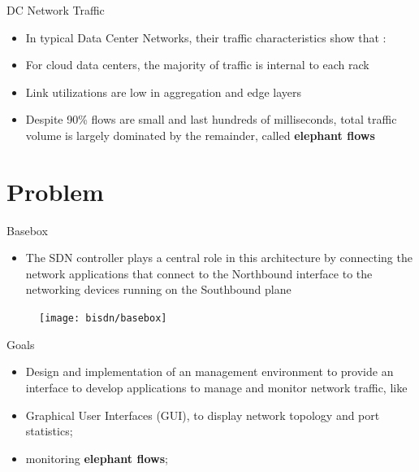 \documentclass{beamer}
\begin{document}
\begin{frame}{DC Network Traffic}
    \begin{itemize}
        \item In typical Data Center Networks, their traffic characteristics show that \cite{mori_identifying_2004}:
            \pause
        \item For cloud data centers, the majority of traffic is internal to each rack
            \pause
        \item Link utilizations are low in aggregation and edge layers
            \pause
        \item Despite 90\% flows are small and last hundreds of milliseconds, total traffic volume is largely dominated by the remainder, called 
            \textbf{elephant flows} \cite{benson_network_2010}
    \end{itemize}
\end{frame}

\section{Problem}

\begin{frame}{Basebox}
    \begin{itemize}
        \item The SDN controller plays a central role in this architecture by connecting the network applications that connect to the Northbound interface to the
            networking devices running on the Southbound plane
    \end{itemize}
    \pause
    \begin{figure}
        \texttt{[image: bisdn/basebox]}
    \end{figure}
\end{frame}

\begin{frame}{Goals}
    \begin{itemize}
        \item Design and implementation of an management environment to provide an interface to develop applications 
            to manage and monitor network traffic, like
            \pause 
        \item Graphical User Interfaces (GUI), to display network topology and port statistics;
            \pause
        \item monitoring \textbf{elephant flows};
    \end{itemize}
\end{frame}
\end{document}
